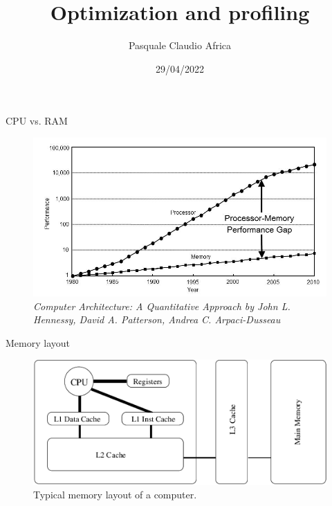 \documentclass[10pt]{beamer}
\begin{document}
    \title{Optimization and profiling}
    \author{Pasquale Claudio Africa}
    \date{29/04/2022}

\begin{frame}
    \maketitle
\end{frame}

\begin{frame}{CPU vs. RAM}
    \begin{figure}
        \centering
        \includegraphics[width=\textwidth]{images/cpu_memory_performance_gap.png}
        \caption{\textit{Computer Architecture: A Quantitative Approach by John L. Hennessy, David A. Patterson, Andrea C. Arpaci-Dusseau}}
    \end{figure}
\end{frame}

\begin{frame}{Memory layout}
    \begin{figure}
        \centering
        \includegraphics[width=\textwidth]{images/memory_layout.png}
        \caption{Typical memory layout of a computer.}
    \end{figure}
\end{frame}
\end{document}
